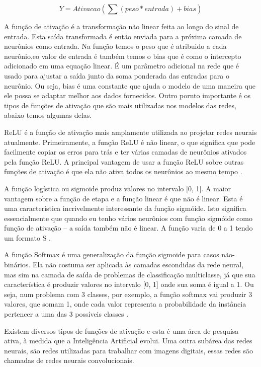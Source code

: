 \documentclass[openright]{UFRGS} %
\begin{document}
\[ Y = Ativacao(\sum (peso * entrada) + bias) \]

A função de ativação é a transformação não linear feita ao longo do sinal de entrada. Esta saída transformada é então enviada para a próxima camada de neurônios como entrada. Na função temos o peso que é atribuido a cada neurônio,eo valor de entrada é também temos o bias que é como o intercepto adicionado em uma equação linear. É um parâmetro adicional na rede que é usado para ajustar a saída junto da soma ponderada das entradas para o neurônio. Ou seja, bias é uma constante que ajuda o modelo de uma maneira que ele possa se adaptar melhor aos dados fornecidos. Outro pornto importante é os tipos de funções de ativação que são mais utilizadas nos modelos das redes, abaixo temos algumas delas.


ReLU é a função de ativação mais amplamente utilizada ao projetar redes neurais atualmente. Primeiramente, a função ReLU é não linear, o que significa que pode facilmente copiar os erros para trás e ter várias camadas de neurônios ativados pela função ReLU. A principal vantagem de usar a função ReLU sobre outras funções de ativação é que ela não ativa todos os neurônios ao mesmo tempo \cite{gomide2012redes}.



A função logística ou sigmoide produz valores no intervalo [0, 1].
 A maior vantagem sobre a função de etapa e a função linear é que não é linear. Esta é uma característica incrivelmente interessante da função sigmóide. Isto significa essencialmente que quando eu tenho vários neurônios com função sigmóide como função de ativação – a saída também não é linear. A função varia de 0 a 1 tendo um formato S  \cite{gomide2012redes}.


A função Softmax é uma generalização da função sigmoide para casos não-binários. Ela não costuma ser aplicada às camadas escondidas da rede neural, mas sim na camada de saída de problemas de classificação multiclasse, já que sua característica é produzir valores no intervalo [0, 1] onde sua soma é igual a 1. Ou seja, num problema com 3 classes, por exemplo, a função softmax vai produzir 3 valores, que somam 1, onde cada valor representa a probabilidade da instância pertencer a uma das 3 possíveis classes \cite{gomide2012redes}.

Existem diversos tipos de funções de ativação e esta é uma área de pesquisa ativa, à medida que a Inteligência Artificial evolui. Uma outra subárea das redes neurais, são redes  utilizadas para trabalhar com imagens digitais, essas redes são chamadas de redes neurais convolucionais.
\end{document}
